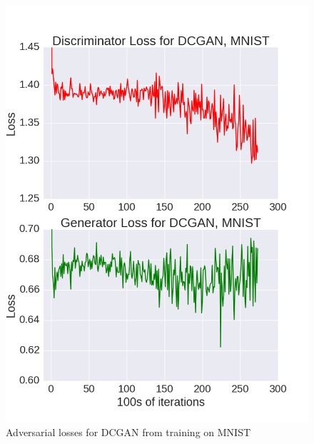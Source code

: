 \documentclass{article}
\begin{document}
\begin{figure}[!htb]%
  \centering
  \includegraphics[width=.85\linewidth]{figures/Loss_Graph_MNIST_T=1.png}
  \caption{Adversarial losses for DCGAN from training on MNIST}
  \label{fig6}
\end{figure}
\end{document}
